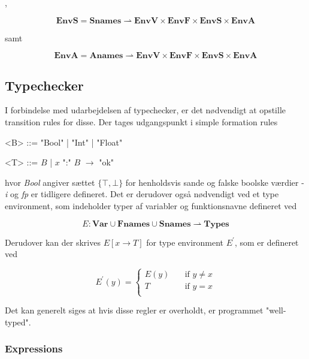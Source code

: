 \noindent ,

$$ \textbf{EnvS} = \textbf{Snames} \rightharpoonup \textbf{EnvV} \times \textbf{EnvF} \times \textbf{EnvS} \times \textbf{EnvA} $$

\noindent samt

$$ \textbf{EnvA} = \textbf{Anames} \rightharpoonup \textbf{EnvV} \times \textbf{EnvF} \times \textbf{EnvS} \times \textbf{EnvA} $$

\subsection{Typechecker}
I forbindelse med udarbejdelsen af typechecker, er det nødvendigt at opstille transition rules for disse. Der tages udgangspunkt i simple formation rules

\begin{grammar}
    \centering
    <B> ::= "Bool" | "Int" | "Float"
    
    <T> ::= $B$ | $x$ ":" $B$ $\rightarrow$ "ok"
\end{grammar}

\noindent hvor \textit{Bool} angiver sættet $\{\top, \bot\}$ for henholdsvis sande og falske boolske værdier - \textit{i} og \textit{fp} er tidligere defineret. Det er derudover også nødvendigt ved et type environment, som indeholder typer af variabler og funktionsnavne defineret ved 

$$ E : \textbf{Var} \cup \textbf{Fnames} \cup \textbf{Snames} \rightharpoonup \textbf{Types} $$

\noindent Derudover kan der skrives $E[x \rightarrow T]$ for type environment $E^\prime$, som er defineret ved 

\[ E^\prime(y) =
  \begin{cases}
    E(y)       & \quad \text{if } y \ne x\\
    T          & \quad \text{if } y = x\\
  \end{cases}
\]

\noindent Det kan generelt siges at hvis disse regler er overholdt, er programmet "well-typed"\mbox{}.

\subsubsection{Expressions}


